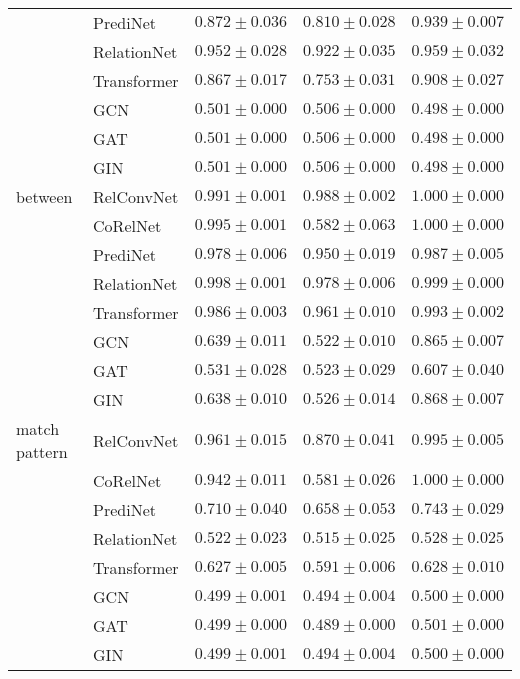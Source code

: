 \begin{tabular}{lllll}
              & PrediNet &  $0.872 \pm 0.036$ &  $0.810 \pm 0.028$ &  $0.939 \pm 0.007$ \\
              & RelationNet &  $0.952 \pm 0.028$ &  $0.922 \pm 0.035$ &  $0.959 \pm 0.032$ \\
              & Transformer &  $0.867 \pm 0.017$ &  $0.753 \pm 0.031$ &  $0.908 \pm 0.027$ \\
              & GCN &  $0.501 \pm 0.000$ &  $0.506 \pm 0.000$ &  $0.498 \pm 0.000$ \\
              & GAT &  $0.501 \pm 0.000$ &  $0.506 \pm 0.000$ &  $0.498 \pm 0.000$ \\
              & GIN &  $0.501 \pm 0.000$ &  $0.506 \pm 0.000$ &  $0.498 \pm 0.000$ \\\hline
between & RelConvNet &  $0.991 \pm 0.001$ &  $0.988 \pm 0.002$ &  $1.000 \pm 0.000$ \\
              & CoRelNet &  $0.995 \pm 0.001$ &  $0.582 \pm 0.063$ &  $1.000 \pm 0.000$ \\
              & PrediNet &  $0.978 \pm 0.006$ &  $0.950 \pm 0.019$ &  $0.987 \pm 0.005$ \\
              & RelationNet &  $0.998 \pm 0.001$ &  $0.978 \pm 0.006$ &  $0.999 \pm 0.000$ \\
              & Transformer &  $0.986 \pm 0.003$ &  $0.961 \pm 0.010$ &  $0.993 \pm 0.002$ \\
              & GCN &  $0.639 \pm 0.011$ &  $0.522 \pm 0.010$ &  $0.865 \pm 0.007$ \\
              & GAT &  $0.531 \pm 0.028$ &  $0.523 \pm 0.029$ &  $0.607 \pm 0.040$ \\
              & GIN &  $0.638 \pm 0.010$ &  $0.526 \pm 0.014$ &  $0.868 \pm 0.007$ \\\hline
match pattern & RelConvNet &  $0.961 \pm 0.015$ &  $0.870 \pm 0.041$ &  $0.995 \pm 0.005$ \\
              & CoRelNet &  $0.942 \pm 0.011$ &  $0.581 \pm 0.026$ &  $1.000 \pm 0.000$ \\
              & PrediNet &  $0.710 \pm 0.040$ &  $0.658 \pm 0.053$ &  $0.743 \pm 0.029$ \\
              & RelationNet &  $0.522 \pm 0.023$ &  $0.515 \pm 0.025$ &  $0.528 \pm 0.025$ \\
              & Transformer &  $0.627 \pm 0.005$ &  $0.591 \pm 0.006$ &  $0.628 \pm 0.010$ \\
              & GCN &  $0.499 \pm 0.001$ &  $0.494 \pm 0.004$ &  $0.500 \pm 0.000$ \\
              & GAT &  $0.499 \pm 0.000$ &  $0.489 \pm 0.000$ &  $0.501 \pm 0.000$ \\
              & GIN &  $0.499 \pm 0.001$ &  $0.494 \pm 0.004$ &  $0.500 \pm 0.000$ \\
\bottomrule
\end{tabular}
